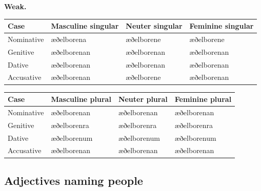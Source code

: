 \textbf{Weak.}

\par\begingroup
\fontsize{10.5}{13.2}\selectfont
\setlength{\LTleft}{0pt}\setlength{\LTright}{\fill}
\noindent
\begin{tabular}{@{}>{\raggedright\arraybackslash}p{22.0mm}>{\raggedright\arraybackslash}p{31.188mm}>{\raggedright\arraybackslash}p{31.188mm}>{\raggedright\arraybackslash}p{31.188mm}@{}}
\toprule
\textbf{Case} & \textbf{Masculine singular} & \textbf{Neuter singular} & \textbf{Feminine singular} \\
\midrule
Nominative & æðelborena & æðelborene & æðelborene \\
Genitive & æðelborenan & æðelborenan & æðelborenan \\
Dative & æðelborenan & æðelborenan & æðelborenan \\
Accusative & æðelborenan & æðelborene & æðelborenan \\
\bottomrule
\end{tabular}
\par\endgroup
\par\addvspace{5pt}
\par\begingroup
\fontsize{10.5}{13.2}\selectfont
\setlength{\LTleft}{0pt}\setlength{\LTright}{\fill}
\noindent
\begin{tabular}{@{}>{\raggedright\arraybackslash}p{22.0mm}>{\raggedright\arraybackslash}p{31.188mm}>{\raggedright\arraybackslash}p{31.188mm}>{\raggedright\arraybackslash}p{31.188mm}@{}}
\toprule
\textbf{Case} & \textbf{Masculine plural} & \textbf{Neuter plural} & \textbf{Feminine plural} \\
\midrule
Nominative & æðelborenan & æðelborenan & æðelborenan \\
Genitive & æðelborenra & æðelborenra & æðelborenra \\
Dative & æðelborenum & æðelborenum & æðelborenum \\
Accusative & æðelborenan & æðelborenan & æðelborenan \\
\bottomrule
\end{tabular}
\par\endgroup

\subsection*{Adjectives naming people}

